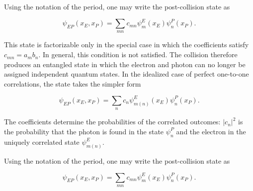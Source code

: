 






Using the notation of the period, one may write the post-collision state as

\begin{equation*}
\psi_{EP}(x_E,x_P)
=
\sum_{mn} c_{mn}\psi^E_m(x_E)\psi^P_n(x_P).
\end{equation*}

This state is factorizable only in the special case in which the coefficients satisfy $c_{mn}=a_m b_n$. In general, this condition is not satisfied. The collision therefore produces an entangled state in which the electron and photon can no longer be assigned independent quantum states. In the idealized case of perfect one-to-one correlations, the state takes the simpler form

\begin{equation*}
\psi_{EP}(x_E,x_P)
=
\sum_n c_n\psi^E_{m(n)}(x_E)\psi^P_n(x_P).
\end{equation*}

The coefficients determine the probabilities of the correlated outcomes: $\left|c_n\right|^2$ is the probability that the photon is found in the state $\psi^P_n$ and the electron in the uniquely correlated state $\psi^E_{m(n)}$. 


Using the notation of the period, one may write the post-collision state as

\begin{equation*}
\psi_{EP}(x_E,x_P)
=
\sum_{mn} c_{mn}\psi^E_m(x_E)\psi^P_n(x_P).
\end{equation*}

